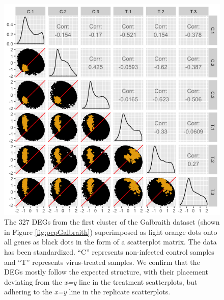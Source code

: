 \documentclass[11pt,a4paper,oldfontcommands,openany]{memoir}
\numberwithin{equation}{section} %
\begin{document}
\begin{figure}[H]
  \includegraphics[width=\textwidth]{Images/GalbraithClust1SM}
  \caption{The 327 DEGs from the first cluster of the Galbraith dataset (shown in Figure \ref{fig:pcpGalbraith}) superimposed as light orange dots onto all genes as black dots in the form of a scatterplot matrix. The data has been standardized. ``C'' represents non-infected control samples and ``T'' represents virus-treated samples. We confirm that the DEGs mostly follow the expected structure, with their placement deviating from the \textit{x=y} line in the treatment scatterplots, but adhering to the \textit{x=y} line in the replicate scatterplots.}
  \label{fig:GalbraithClust1SM}
\end{figure}
\end{document}
